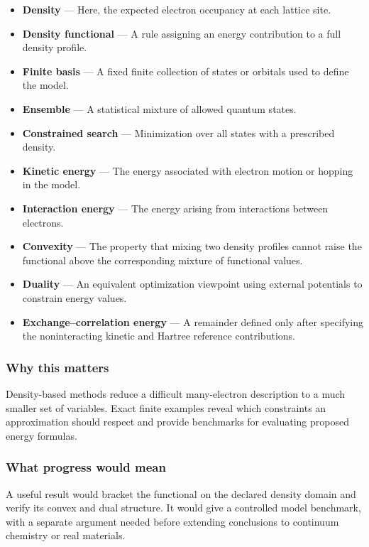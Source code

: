 \documentclass[
  11pt,
]{article}
\begin{document}
\begin{itemize}
\item
  \textbf{Density} --- Here, the expected electron occupancy at each
  lattice site.
\item
  \textbf{Density functional} --- A rule assigning an energy
  contribution to a full density profile.
\item
  \textbf{Finite basis} --- A fixed finite collection of states or
  orbitals used to define the model.
\item
  \textbf{Ensemble} --- A statistical mixture of allowed quantum states.
\item
  \textbf{Constrained search} --- Minimization over all states with a
  prescribed density.
\item
  \textbf{Kinetic energy} --- The energy associated with electron motion
  or hopping in the model.
\item
  \textbf{Interaction energy} --- The energy arising from interactions
  between electrons.
\item
  \textbf{Convexity} --- The property that mixing two density profiles
  cannot raise the functional above the corresponding mixture of
  functional values.
\item
  \textbf{Duality} --- An equivalent optimization viewpoint using
  external potentials to constrain energy values.
\item
  \textbf{Exchange--correlation energy} --- A remainder defined only
  after specifying the noninteracting kinetic and Hartree reference
  contributions.
\end{itemize}

\subsubsection{Why this matters}

Density-based methods reduce a difficult many-electron description to a
much smaller set of variables. Exact finite examples reveal which
constraints an approximation should respect and provide benchmarks for
evaluating proposed energy formulas.

\subsubsection{What progress would mean}

A useful result would bracket the functional on the declared density
domain and verify its convex and dual structure. It would give a
controlled model benchmark, with a separate argument needed before
extending conclusions to continuum chemistry or real materials.
\end{document}
